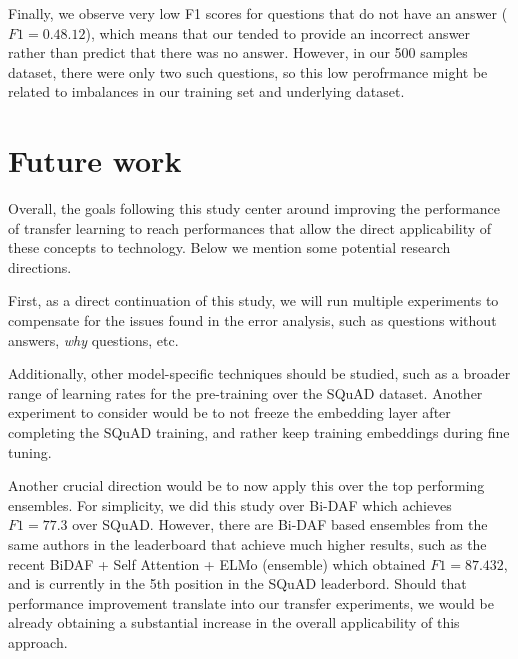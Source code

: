 \documentclass[11pt,a4paper]{article}
\begin{document}
Finally, we observe very low F1 scores for questions that do not have an answer ($F1 = 0.48.12$), which means that our tended to provide an incorrect answer rather than predict that there was no answer. However, in our 500 samples dataset, there were only two such questions, so this low perofrmance might be related to imbalances in our training set and underlying dataset.


\section{Future work}
\label{sec:next_steps}

Overall, the goals following this study center around improving the performance of transfer learning to reach performances that allow the direct applicability of these concepts to technology. Below we mention some potential research directions.

First, as a direct continuation of this study, we will run multiple experiments to compensate for the issues found in the error analysis, such as questions without answers, \textit{why} questions, etc.

Additionally, other model-specific techniques should be studied, such as a broader range of learning rates for the pre-training over the SQuAD dataset. Another experiment to consider would be to not freeze the embedding layer after completing the SQuAD training, and rather keep training embeddings during fine tuning.

Another crucial direction would be to now apply this over the top performing ensembles. For simplicity, we did this study over Bi-DAF which achieves $F1 = 77.3$ over SQuAD. However, there are Bi-DAF based ensembles from the same authors in the leaderboard that achieve much higher results, such as the recent BiDAF + Self Attention + ELMo (ensemble) which obtained $F1 = 87.432$, and is currently in the 5th position in the SQuAD leaderbord. Should that performance improvement translate into our transfer experiments, we would be already obtaining a substantial increase in the overall applicability of this approach.


%
%


\end{document}

